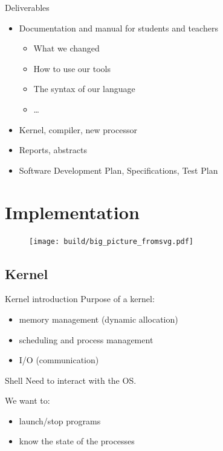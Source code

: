 \documentclass{beamer}
\begin{document}
      \begin{frame}{Deliverables}
        \begin{itemize}
          \item Documentation and manual for students and teachers
            \begin{itemize}
              \item What we changed
              \item How to use our tools
              \item The syntax of our language
              \item \dots
            \end{itemize}
          \item Kernel, compiler, new processor
          \item Reports, abstracts
          \item Software Development Plan, Specifications, Test Plan
        \end{itemize}
      \end{frame}

  \section{Implementation}
    \begin{frame}
      \begin{figure}
        \centering
        \texttt{[image: build/big\_picture\_fromsvg.pdf]}
      \end{figure}
    \end{frame}

    \subsection{Kernel}
      \begin{frame}{Kernel introduction}
        Purpose of a kernel:
        \begin{itemize}
          \item memory management (dynamic allocation)
          \item scheduling and process management
          \item I/O (communication)
        \end{itemize}
      \end{frame}

      \begin{frame}{Shell}
          Need to interact with the OS.
          
          We want to:
          \begin{itemize}
            \item launch/stop programs
            \item know the state of the processes
          \end{itemize}
      \end{frame}
\end{document}

